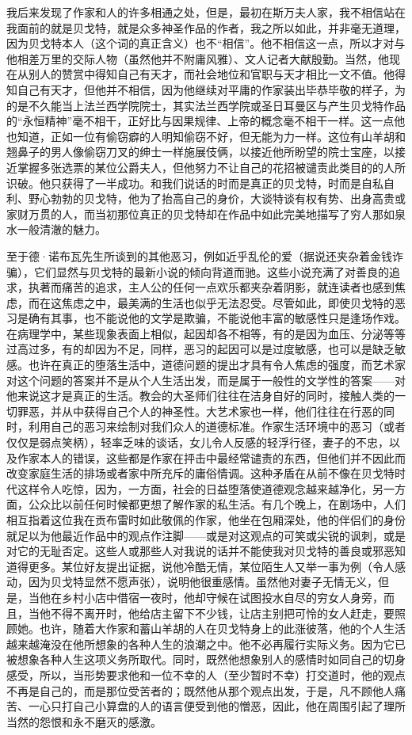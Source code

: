 \par 我后来发现了作家和人的许多相通之处，但是，最初在斯万夫人家，我不相信站在我面前的就是贝戈特，就是众多神圣作品的作者，我之所以如此，并非毫无道理，因为贝戈特本人（这个词的真正含义）也不“相信”。他不相信这一点，所以才对与他相差万里的交际人物（虽然他并不附庸风雅）、文人记者大献殷勤。当然，他现在从别人的赞赏中得知自己有天才，而社会地位和官职与天才相比一文不值。他得知自己有天才，但他并不相信，因为他继续对平庸的作家装出毕恭毕敬的样子，为的是不久能当上法兰西学院院士，其实法兰西学院或圣日耳曼区与产生贝戈特作品的“永恒精神”毫不相干，正好比与因果规律、上帝的概念毫不相干一样。这一点他也知道，正如一位有偷窃癖的人明知偷窃不好，但无能为力一样。这位有山羊胡和翘鼻子的男人像偷窃刀叉的绅士一样施展伎俩，以接近他所盼望的院士宝座，以接近掌握多张选票的某位公爵夫人，但他努力不让自己的花招被谴责此类目的的人所识破。他只获得了一半成功。和我们说话的时而是真正的贝戈特，时而是自私自利、野心勃勃的贝戈特，他为了抬高自己的身价，大谈特谈有权有势、出身高贵或家财万贯的人，而当初那位真正的贝戈特却在作品中如此完美地描写了穷人那如泉水一般清澈的魅力。
\par 至于德·诺布瓦先生所谈到的其他恶习，例如近乎乱伦的爱（据说还夹杂着金钱诈骗），它们显然与贝戈特的最新小说的倾向背道而驰。这些小说充满了对善良的追求，执著而痛苦的追求，主人公的任何一点欢乐都夹杂着阴影，就连读者也感到焦虑，而在这焦虑之中，最美满的生活也似乎无法忍受。尽管如此，即使贝戈特的恶习是确有其事，也不能说他的文学是欺骗，不能说他丰富的敏感性只是逢场作戏。在病理学中，某些现象表面上相似，起因却各不相等，有的是因为血压、分泌等等过高过多，有的却因为不足，同样，恶习的起因可以是过度敏感，也可以是缺乏敏感。也许在真正的堕落生活中，道德问题的提出才具有令人焦虑的强度，而艺术家对这个问题的答案并不是从个人生活出发，而是属于一般性的文学性的答案——对他来说这才是真正的生活。教会的大圣师们往往在洁身自好的同时，接触人类的一切罪恶，并从中获得自己个人的神圣性。大艺术家也一样，他们往往在行恶的同时，利用自己的恶习来绘制对我们众人的道德标准。作家生活环境中的恶习（或者仅仅是弱点笑柄），轻率乏味的谈话，女儿令人反感的轻浮行径，妻子的不忠，以及作家本人的错误，这些都是作家在抨击中最经常谴责的东西，但他们并不因此而改变家庭生活的排场或者家中所充斥的庸俗情调。这种矛盾在从前不像在贝戈特时代这样令人吃惊，因为，一方面，社会的日益堕落使道德观念越来越净化，另一方面，公众比以前任何时候都更想了解作家的私生活。有几个晚上，在剧场中，人们相互指着这位我在贡布雷时如此敬佩的作家，他坐在包厢深处，他的伴侣们的身份就足以为他最近作品中的观点作注脚——或是对这观点的可笑或尖锐的讽刺，或是对它的无耻否定。这些人或那些人对我说的话并不能使我对贝戈特的善良或邪恶知道得更多。某位好友提出证据，说他冷酷无情，某位陌生人又举一事为例（令人感动，因为贝戈特显然不愿声张），说明他很重感情。虽然他对妻子无情无义，但是，当他在乡村小店中借宿一夜时，他却守候在试图投水自尽的穷女人身旁，而且，当他不得不离开时，他给店主留下不少钱，让店主别把可怜的女人赶走，要照顾她。也许，随着大作家和蓄山羊胡的人在贝戈特身上的此涨彼落，他的个人生活越来越淹没在他所想象的各种人生的浪潮之中。他不必再履行实际义务。因为它已被想象各种人生这项义务所取代。同时，既然他想象别人的感情时如同自己的切身感受，所以，当形势要求他和一位不幸的人（至少暂时不幸）打交道时，他的观点不再是自己的，而是那位受苦者的；既然他从那个观点出发，于是，凡不顾他人痛苦、一心只打自己小算盘的人的语言便受到他的憎恶，因此，他在周围引起了理所当然的怨恨和永不磨灭的感激。
